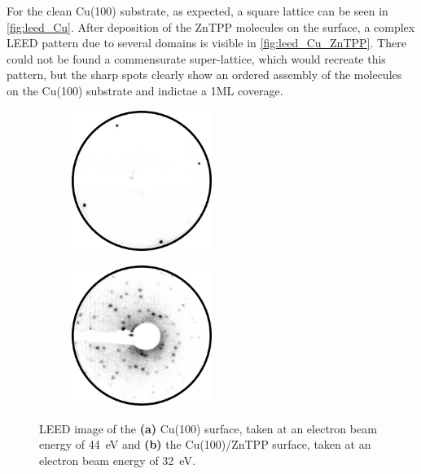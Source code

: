 For the clean Cu(100) substrate, as expected, a square lattice can be seen in \autoref{fig:leed_Cu}.
After deposition of the ZnTPP molecules on the surface, a complex LEED pattern due to several domains is visible in \autoref{fig:leed_Cu_ZnTPP}.
There could not be found a commensurate super-lattice, which would recreate this pattern, but the sharp spots clearly show an ordered assembly of the molecules on the Cu(100) substrate and indictae a 1ML coverage.
\begin{figure}[h]
    \centering
    \begin{subfigure}{0.49\textwidth}
        \centering
        \includegraphics[width = 0.5\textwidth]{Plots/Cu.png}
        \caption{}
        \label{fig:leed_Cu}
    \end{subfigure}
    \hfill
    \begin{subfigure}{0.49\textwidth}
        \centering
        \includegraphics[width = 0.5\textwidth]{Plots/Cu_ZnTPP.png}
        \caption{}
        \label{fig:leed_Cu_ZnTPP}
    \end{subfigure}
    \caption{LEED image of the \textbf{(a)} Cu(100) surface, taken at an electron beam energy of \qty{44}{eV} and \textbf{(b)} the Cu(100)/ZnTPP surface, taken at an electron beam energy of \qty{32}{eV}.}
    \label{fig:leed_2}
\end{figure}
\FloatBarrier

